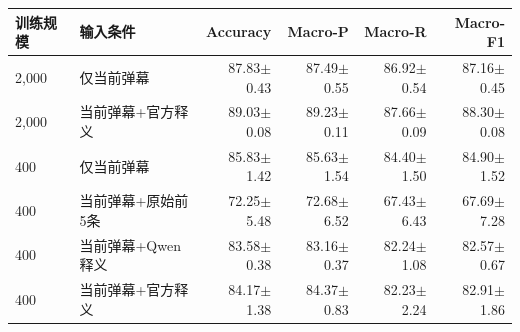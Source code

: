 \begin{tabular}{llrrrr}
\toprule
训练规模 & 输入条件 & Accuracy & Macro-P & Macro-R & Macro-F1 \\
\midrule
2,000 & 仅当前弹幕 & 87.83$\pm$0.43 & 87.49$\pm$0.55 & 86.92$\pm$0.54 & 87.16$\pm$0.45 \\
2,000 & 当前弹幕+官方释义 & 89.03$\pm$0.08 & 89.23$\pm$0.11 & 87.66$\pm$0.09 & 88.30$\pm$0.08 \\
400 & 仅当前弹幕 & 85.83$\pm$1.42 & 85.63$\pm$1.54 & 84.40$\pm$1.50 & 84.90$\pm$1.52 \\
400 & 当前弹幕+原始前5条 & 72.25$\pm$5.48 & 72.68$\pm$6.52 & 67.43$\pm$6.43 & 67.69$\pm$7.28 \\
400 & 当前弹幕+Qwen释义 & 83.58$\pm$0.38 & 83.16$\pm$0.37 & 82.24$\pm$1.08 & 82.57$\pm$0.67 \\
400 & 当前弹幕+官方释义 & 84.17$\pm$1.38 & 84.37$\pm$0.83 & 82.23$\pm$2.24 & 82.91$\pm$1.86 \\
\bottomrule
\end{tabular}
